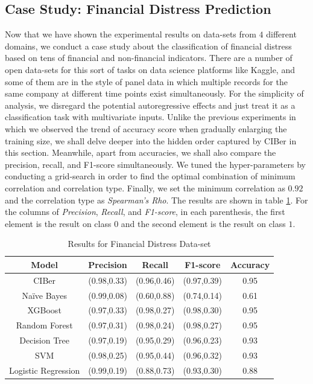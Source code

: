 \documentclass[twoside,11pt]{article}
\begin{document}
\subsection{Case Study: Financial Distress Prediction}
Now that we have shown the experimental results on data-sets from $4$ different domains, we conduct a case study about the classification of financial distress based on tens of financial and non-financial indicators. There are a number of open data-sets for this sort of tasks on data science platforms like Kaggle, and some of them are in the style of panel data in which multiple records for the same company at different time points exist simultaneously. For the simplicity of analysis, we disregard the potential autoregressive effects and just treat it as a classification task with multivariate inputs. Unlike the previous experiments in which we observed the trend of accuracy score when gradually enlarging the training size, we shall delve deeper into the hidden order captured by CIBer in this section. Meanwhile, apart from accuracies, we shall also compare the precision, recall, and F1-score simultaneously. We tuned the hyper-parameters by conducting a grid-search in order to find the optimal combination of minimum correlation and correlation type. Finally, we set the minimum correlation as $0.92$ and the correlation type as \textit{Spearman's Rho}. The results are shown in table \ref{fina_result}. For the columns of \textit{Precision}, \textit{Recall}, and \textit{F1-score}, in each parenthesis, the first element is the result on class $0$ and the second element is the result on class $1$. 

\begin{table}
\centering
 \begin{tabular}{||c c c c c||}
 \hline
 Model & Precision & Recall & F1-score & Accuracy\\ [0.5ex] 
 \hline\hline
 CIBer & (0.98,0.33) & (0.96,0.46) & (0.97,0.39) & 0.95 \\ 
 \hline
 Na\"ive Bayes & (0.99,0.08) & (0.60,0.88) & (0.74,0.14) & 0.61 \\
 \hline
 XGBoost & (0.97,0.33) & (0.98,0.27) & (0.98,0.30) & 0.95 \\
 \hline
 Random Forest & (0.97,0.31) & (0.98,0.24) & (0.98,0.27) & 0.95 \\
 \hline
 Decision Tree & (0.97,0.19) & (0.95,0.29) & (0.96,0.23) & 0.93 \\
 \hline
 SVM & (0.98,0.25) & (0.95,0.44) & (0.96,0.32) & 0.93 \\
 \hline
 Logistic Regression & (0.99,0.19) & (0.88,0.73) & (0.93,0.30) & 0.88 \\ [1ex] 
 \hline
 \end{tabular}
\caption{Results for Financial Distress Data-set}
\label{fina_result}
\end{table}
\end{document}
